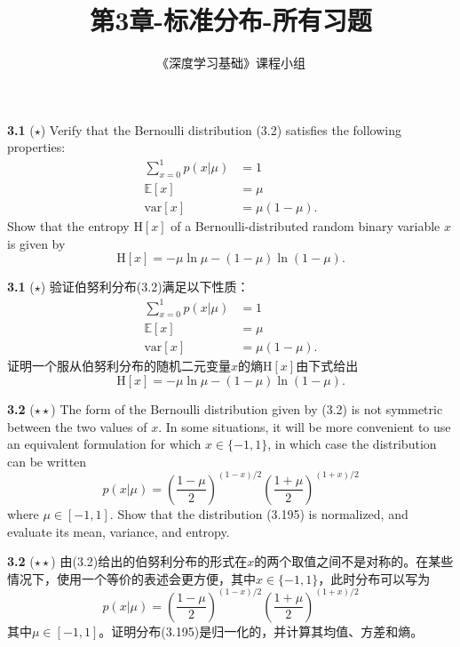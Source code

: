 \documentclass{article}
\title{第3章-标准分布-所有习题}
\author{《深度学习基础》课程小组}
\begin{document}
\maketitle

\textbf{3.1} ($\star$) Verify that the Bernoulli distribution (3.2) satisfies the following properties:
\begin{align}
\sum_{x=0}^{1} p(x|\mu) &= 1 \tag{3.191} \\
\mathbb{E}[x] &= \mu \tag{3.192} \\
\text{var}[x] &= \mu(1-\mu). \tag{3.193}
\end{align}
Show that the entropy $\mathrm{H}[x]$ of a Bernoulli-distributed random binary variable $x$ is given by
\begin{equation}
\mathrm{H}[x] = -\mu \ln \mu - (1-\mu) \ln(1-\mu). \tag{3.194}
\end{equation}

\textbf{3.1} ($\star$) 验证伯努利分布(3.2)满足以下性质：
\begin{align}
\sum_{x=0}^{1} p(x|\mu) &= 1 \tag{3.191} \\
\mathbb{E}[x] &= \mu \tag{3.192} \\
\text{var}[x] &= \mu(1-\mu). \tag{3.193}
\end{align}
证明一个服从伯努利分布的随机二元变量$x$的熵$\mathrm{H}[x]$由下式给出
\begin{equation}
\mathrm{H}[x] = -\mu \ln \mu - (1-\mu) \ln(1-\mu). \tag{3.194}
\end{equation}

\textbf{3.2} ($\star\star$) The form of the Bernoulli distribution given by (3.2) is not symmetric between the two values of $x$. In some situations, it will be more convenient to use an equivalent formulation for which $x \in \{-1, 1\}$, in which case the distribution can be written
\begin{equation}
p(x|\mu) = \left(\frac{1-\mu}{2}\right)^{(1-x)/2} \left(\frac{1+\mu}{2}\right)^{(1+x)/2} \tag{3.195}
\end{equation}
where $\mu \in [-1, 1]$. Show that the distribution (3.195) is normalized, and evaluate its mean, variance, and entropy.

\textbf{3.2} ($\star\star$) 由(3.2)给出的伯努利分布的形式在$x$的两个取值之间不是对称的。在某些情况下，使用一个等价的表述会更方便，其中$x \in \{-1, 1\}$，此时分布可以写为
\begin{equation}
p(x|\mu) = \left(\frac{1-\mu}{2}\right)^{(1-x)/2} \left(\frac{1+\mu}{2}\right)^{(1+x)/2} \tag{3.195}
\end{equation}
其中$\mu \in [-1, 1]$。证明分布(3.195)是归一化的，并计算其均值、方差和熵。
\end{document}

